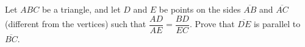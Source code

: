 Let $ABC$ be a triangle, and let $D$ and $E$ be points on the sides $\overline{AB}$ and $\overline{AC}$ (different from the vertices) such that $\dfrac{AD}{AE}=\dfrac{BD}{EC}$. Prove that $\overline{DE}$ is parallel to $\overline{BC}$.
